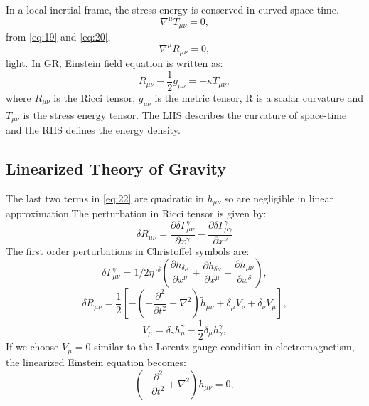 \documentclass{ttuthes2007}
\begin{document}
In a local inertial frame, the stress-energy is conserved in curved
space-time.
\begin{equation} \label{eq:20}
\nabla ^\mu T_{\mu \nu} =0,
\end{equation}
from \ref{eq:19} and \ref{eq:20},
\begin{equation}
\nabla ^\mu R_{\mu \nu} =0,
\end{equation}
light. In \ac{GR}, Einstein field equation is written as:
\begin{equation}
R_{\mu\nu} -\frac{1}{2}g_{\mu\nu}=-\kappa T_{\mu\nu},
\end{equation}	
where $R_{\mu\nu}$ is the Ricci tensor, $g_{\mu\nu}$ is the metric tensor, R is a scalar
curvature and $T_{\mu\nu}$ is the stress energy tensor. The LHS describes the
curvature of space-time and the RHS defines the energy density.\\

\subsection{Linearized Theory of Gravity}
The last two terms in \ref{eq:22} are quadratic in $h_{\mu \nu}$ so are negligible
in linear approximation.The perturbation in Ricci tensor is given by:
\begin{equation} \label{eq:23}
\delta R_{\mu \nu} = \frac{\partial \delta \Gamma ^\gamma _{\mu \nu}}{\partial 
x^\gamma} - \frac{\partial \delta \Gamma ^\gamma _{\mu \gamma}}{\partial x^\nu}
\end{equation}
The first order perturbations in Christoffel symbols are:
\begin{equation} \label{eq:24}
\delta \Gamma ^\gamma _{\mu \nu}= 1/2 \eta^{\gamma \delta}\left(\frac{\partial
h_{\delta \mu }}{\partial x^\nu} + \frac{\partial h_{\delta \nu }}{\partial
x^\mu} -\frac{\partial  h_{\mu \nu }}{\partial x^\delta}\right),
\end{equation}
\begin{equation} \label{eq:25}
\delta R_{\mu \nu} = \frac{1}{2}\left[ -\left(-\frac{\partial^2}{\partial
t^2}+\nabla ^2\right)\tilde h_{\mu\nu} + \delta_\mu V_\nu + \delta_\nu V_\mu
\right],
\end{equation}
\begin{equation} \label{eq:26}
V_\mu = \delta_\gamma h^\gamma_\mu - \frac{1}{2}\delta_\mu h^\gamma_\gamma,
\end{equation}
	If we choose $V_\mu=0$ similar to the Lorentz gauge condition in
electromagnetism, the linearized Einstein equation becomes:
\begin{equation} \label{eq:27}
\left(-\frac{\partial^2}{\partial t^2}+\nabla ^2\right)\tilde h_{\mu\nu} = 0, 
\end{equation}
\end{document}
